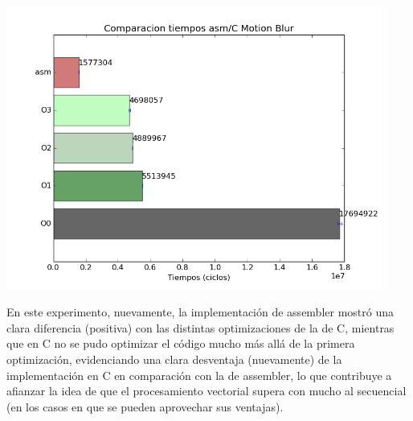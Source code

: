 \documentclass[a4paper]{article}
\begin{document}
\includegraphics[width=350pt]{imagenes/CompCasm4.png}

En este experimento, nuevamente, la implementaci\'{o}n de assembler mostr\'{o} una clara diferencia (positiva) con las distintas optimizaciones de la de C, mientras que en C no se pudo optimizar el c\'{o}digo mucho m\'{a}s all\'{a} de la primera optimizaci\'{o}n, evidenciando una clara desventaja (nuevamente) de la implementaci\'{o}n en C en comparaci\'{o}n con la de assembler, lo que contribuye a afianzar la idea de que el procesamiento vectorial supera con mucho al secuencial (en los casos en que se pueden aprovechar sus ventajas).

\newpage

%
\end{document}
